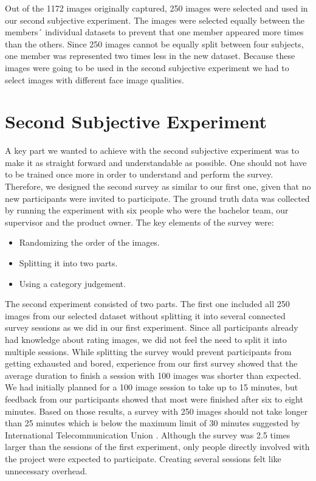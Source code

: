 Out of the 1172 images originally captured, 250 images were selected and used in our second subjective experiment. The images were selected equally between the members´ individual datasets to prevent that one member appeared more times than the others. Since 250 images cannot be equally split between four subjects, one member was represented two times less in the new dataset. Because these images were going to be used in the second subjective experiment we had to select images with different face image qualities. 

\section{Second Subjective Experiment}
\label{sec:secondse}
A key part we wanted to achieve with the second subjective experiment was to make it as straight forward and understandable as possible. One should not have to be trained once more in order to understand and perform the survey. Therefore, we designed the second survey as similar to our first one, given that no new participants were invited to participate. The ground truth data was collected by running the experiment with six people who were the bachelor team, our supervisor and the product owner. The key elements of the survey were: 
\begin{itemize}
    \item Randomizing the order of the images.
    \item Splitting it into two parts. 
    \item Using a category judgement.
\end{itemize}

The second experiment consisted of two parts. The first one included all 250 images from our selected dataset without splitting it into several connected survey sessions as we did in our first experiment. Since all participants already had knowledge about rating images, we did not feel the need to split it into multiple sessions. While splitting the survey would prevent participants from getting exhausted and bored, experience from our first survey showed that the average duration to finish a session with 100 images was shorter than expected. We had initially planned for a 100 image session to take up to 15 minutes, but feedback from our participants showed that most were finished after six to eight minutes. Based on those results, a survey with 250 images should not take longer than 25 minutes which is below the maximum limit of 30 minutes suggested by International Telecommunication Union \cite{methodologySubjective}. Although the survey was 2.5 times larger than the sessions of the first experiment, only people directly involved with the project were expected to participate. Creating several sessions felt like unnecessary overhead. 

